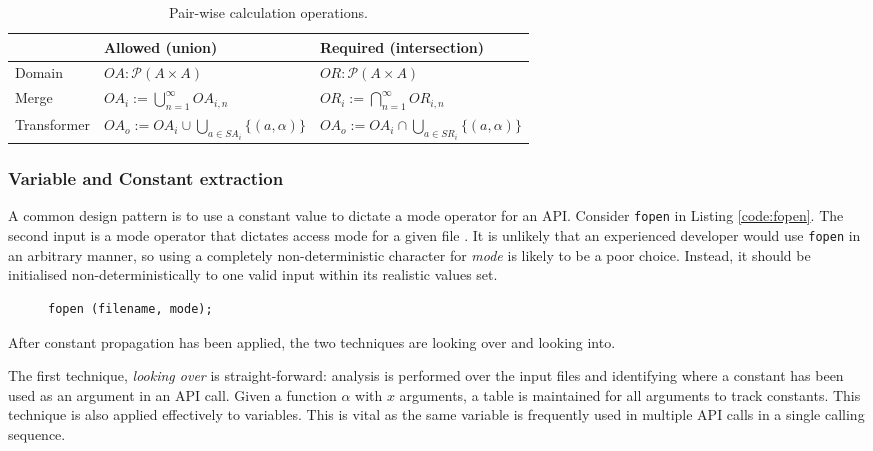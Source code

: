 \documentclass[EPiCempty]{easychair}
\begin{document}
\begin{table}
	\renewcommand{\arraystretch}{1.4}
	\centering
		\begin{tabular}{|l|l|l|}
		\hline
		& Allowed (union)  &  Required (intersection)\\\hline
		Domain	& $ OA : \mathcal{P}(A \times A)$ &$ OR : \mathcal{P}(A \times A)$ \\
		Merge	& $OA_i := \bigcup_{n=1}^{\infty} OA_{i,n}$ & $OR_i := \bigcap_{n=1}^{\infty} OR_{i,n}$\\
		Transformer	& $OA_o := OA_i \cup \bigcup_{a \in SA_i} \{(a, \alpha)\}$ & $OA_o := OA_i \cap \bigcup_{a \in SR_i} \{(a, \alpha)\}$ \\
		\hline
	\end{tabular}
	\caption{Pair-wise calculation operations. 	\label{tab:pair_wise}}
\end{table}


\subsubsection{Variable and Constant extraction}
A common design pattern is to use a constant value to dictate a mode operator for an API.  Consider \texttt{fopen} in Listing \ref{code:fopen}.  The second input is a mode operator that dictates access mode for a given file \cite{fopen}.  It is unlikely that an experienced developer would use \texttt{fopen} in an arbitrary manner, so using a completely non-deterministic character for \textit{mode} is likely to be a poor choice.  Instead, it should be initialised non-deterministically to one valid input within its realistic values set.  

\begin{wrapfigure}[4]{r}{.35\textwidth}
	\begin{lstlisting}[caption={\texttt{fopen}}, numbers=none, label={code:fopen}]
fopen (filename, mode);
	\end{lstlisting}
\end{wrapfigure}



After constant propagation has been applied, the two techniques are looking over and looking into.

The first technique, \emph{looking over} is straight-forward:  analysis is performed over the input files and identifying where a constant has been used as an argument in an API call.  Given a function $\alpha$ with $x$ arguments, a table is maintained for all arguments to track constants.  
This technique is also applied effectively to variables.  This is vital as the same variable is frequently used in multiple API calls in a single calling sequence.  
\end{document}
